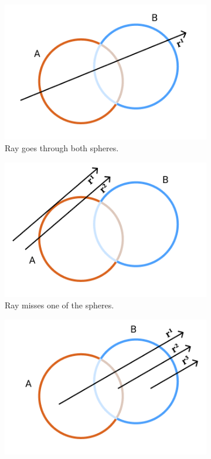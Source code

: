 \documentclass[a4paper,11pt,oneside]{article}
\begin{document}
\begin{figure}[ht]
	\centering
	\begin{subfigure}[b]{0.3\textwidth}
		\centering
		\includegraphics[width=\textwidth]{section3/3.4/union-case-1.png}
		\caption{Ray goes through both spheres.}
		\label{sec3.4:union-case1}
	\end{subfigure}
	\hfill
	\begin{subfigure}[b]{0.3\textwidth}
		\centering
		\includegraphics[width=\textwidth]{section3/3.4/union-case-2.png}
		\caption{Ray misses one of the spheres.}
		\label{sec3.4:union-case2}
	\end{subfigure}
	\hfill
	\begin{subfigure}[b]{0.3\textwidth}
		\centering
		\includegraphics[width=\textwidth]{section3/3.4/union-case-3.png}

\end{subfigure}
\end{figure}
\end{document}
